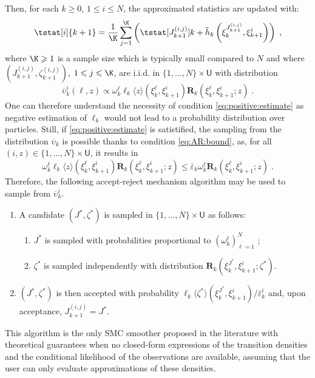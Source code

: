 \documentclass{article}
\newcommand{\addf}[1]{\termletter_{#1}}
\newcommand{\termletter}{\tilde{h}}
\newcommand{\N}{N}
\newcommand{\hkup}{\bar{\varepsilon}}
\newcommand{\bi}[3]{J_{#1}^{(#2, #3)}}
\newcommand{\eqsp}{\;}
\newcommand{\ewght}[2]{\ensuremath{\omega_{#1}^{#2}}}
\newcommand{\epart}[2]{\ensuremath{\xi_{#1}^{#2}}}
\newcommand{\marginalset}{\mathsf{U}}
\newcommand{\kernelmarg}{\mathbf{R}}
\newcommand{\qg}[1]{\ell_{#1}}
\newcommand{\hatqg}[1]{\mathsf{\ell}_{#1}}
\begin{document}
Then, for each $k\geqslant 0$, $1\leqslant i\leqslant \N$, the approximated statistics are updated with:
\begin{equation*}
\tstat[i]{k+1}  = \frac{1}{\K} \sum_{j=1}^{\K} \left( \tstat[\bi{k+1}{i}{j}]{k} + \addf{k}\left(\epart{k}{\bi{k+1}{i}{j}}, \epart{k+1}{i}\right)\right)\eqsp,
\end{equation*}
where $\K\geqslant 1$ is a sample size which  is typically small compared to $\N$ and where $(\bi{k+1}{i}{j},\zeta_{k+1}^{(i,j)})$, $1\leqslant j\leqslant \K$, are i.i.d. in $\{1,\ldots,\N\}\times\marginalset$ with distribution 
$$
\overline \upsilon_k^i(\ell,z)\propto\ewght{k}{\ell}\hatqg{k}\langle z\rangle(\epart{k}{\ell},\epart{k+1}{i})\kernelmarg_{k}(\epart{k}{\ell},\epart{k+1}{i};z)\eqsp.
$$
One can therefore understand the necessity of condition \eqref{eq:positive:estimate} as negative estimation of $\qg{k}$ would not lead to a probability distribution over particles.
Still, if \eqref{eq:positive:estimate} is satistified, the sampling from the distribution $\overline\upsilon_k$ is possible thanks to condition \eqref{eq:AR:bound}, as, for all $(i, z) \in \lbrace 1,\dots,N\rbrace\times\marginalset$, it results in
$$
\ewght{k}{\ell}\hatqg{k}\langle z \rangle(\epart{k}{\ell},\epart{k+1}{i})\kernelmarg_{k}(\epart{k}{\ell},\epart{k+1}{i};z) \leqslant \hkup_k \ewght
{k}{\ell} \kernelmarg_{k}(\epart{k}{\ell},\epart{k+1}{i};z)\eqsp. 
$$
Therefore, the following  accept-reject mechanism algorithm may be used to sample from $\overline \upsilon_k^i$.
\begin{enumerate}
\item A candidate $(J^\ast,\zeta^\ast)$ is sampled in $\{1,\ldots, \N\}\times\marginalset$ as follows: 
\begin{enumerate}
\item $J^\ast$ is sampled with probabilities proportional to  $(\ewght{k}{\ell})_{\ell=1}^{\N}$ ;
\item $\zeta^\ast$ is sampled independently with distribution $\kernelmarg_{k}(\epart{k}{J^\ast},\epart{k+1}{i};\zeta^\ast)$.
\end{enumerate}
\item  $(J^\ast,\zeta^\ast)$ is then accepted with probability $\hatqg{k}\langle \zeta^\ast\rangle(\epart{k}{J^\ast}, \epart{k+1}{i})/\hkup_k^i$ and, upon acceptance, $\bi{k+1}{i}{j} = J^*$.
\end{enumerate}
This algorithm is the only SMC smoother proposed in the literature with  theoretical guarantees when no closed-form expressions of  the  transition  densities and the conditional likelihood of the observations are available,  assuming that the user  can only evaluate  approximations of these densities. 
\end{document}
